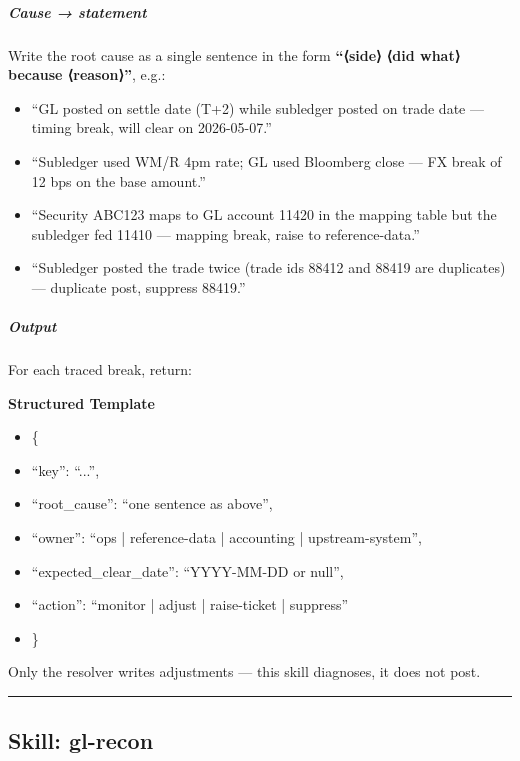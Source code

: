 \documentclass[11pt]{article}
\begin{document}
\subparagraph{Cause → statement}\mbox{}\par

Write the root cause as a single sentence in the form \textbf{``⟨side⟩ ⟨did what⟩ because ⟨reason⟩''}, e.g.:


\begin{itemize}[leftmargin=*,itemsep=2pt,topsep=2pt]
\item {} ``GL posted on settle date (T+2) while subledger posted on trade date — timing break, will clear on 2026-05-07.''
\item {} ``Subledger used WM/R 4pm rate; GL used Bloomberg close — FX break of 12 bps on the base amount.''
\item {} ``Security ABC123 maps to GL account 11420 in the mapping table but the subledger fed 11410 — mapping break, raise to reference-data.''
\item {} ``Subledger posted the trade twice (trade ids 88412 and 88419 are duplicates) — duplicate post, suppress 88419.''
\end{itemize}

\subparagraph{Output}\mbox{}\par

For each traced break, return:


\textbf{Structured Template}
\begin{itemize}[leftmargin=*,itemsep=2pt,topsep=2pt]
\item {} \{
\item {} ``key'': ``...'',
\item {} ``root\_\allowbreak{}cause'': ``one sentence as above'',
\item {} ``owner'': ``ops | reference-data | accounting | upstream-system'',
\item {} ``expected\_\allowbreak{}clear\_\allowbreak{}date'': ``YYYY-MM-DD or null'',
\item {} ``action'': ``monitor | adjust | raise-ticket | suppress''
\item {} \}
\end{itemize}

Only the resolver writes adjustments — this skill diagnoses, it does not post.


\vspace{0.8em}\hrule\vspace{0.8em}

\subsection{Skill: gl-recon}\label{file:skills-gl-recon-SKILL-md}
\end{document}
